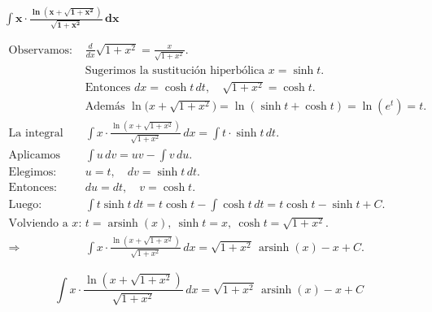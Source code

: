 $\displaystyle \mathbf{\int x \cdot \frac{\ln\left(x + \sqrt{1 + x^{2}}\right)}{\sqrt{1 + x^{2}}}\,dx}$

\nopagebreak
$$
\begin{aligned}
\text{Observamos: } &
\frac{d}{dx}\sqrt{1+x^{2}}=\frac{x}{\sqrt{1+x^{2}}}. \\[6pt]
&\text{Sugerimos la sustitución hiperbólica } x=\sinh t. \\[4pt]
&\text{Entonces } dx=\cosh t\,dt,\quad \sqrt{1+x^{2}}=\cosh t. \\[6pt]
&\text{Además } \ln\big(x+\sqrt{1+x^{2}}\big)
= \ln(\sinh t+\cosh t)=\ln(e^{t})=t. \\[8pt]
\text{La integral queda: } &
\int x\cdot\frac{\ln(x+\sqrt{1+x^{2}})}{\sqrt{1+x^{2}}}\,dx
= \int t\cdot\sinh t\,dt. \\[10pt]
\text{Aplicamos integración por partes: } &
\int u\,dv = uv - \int v\,du. \\[6pt]
\text{Elegimos: } &
u=t,\quad dv=\sinh t\,dt. \\[4pt]
\text{Entonces: } &
du=dt,\quad v=\cosh t. \\[6pt]
\text{Luego: } &
\int t\sinh t\,dt = t\cosh t - \int \cosh t\,dt
= t\cosh t - \sinh t + C. \\[10pt]
\text{Volviendo a } x: &
t=\operatorname{arsinh}(x),\ \sinh t = x,\ \cosh t=\sqrt{1+x^{2}}. \\[6pt]
\Rightarrow\quad &
\int x\cdot\frac{\ln(x+\sqrt{1+x^{2}})}{\sqrt{1+x^{2}}}\,dx
= \sqrt{1+x^{2}}\,\operatorname{arsinh}(x) - x + C.
\end{aligned}
$$

$$
\boxed{\displaystyle
\int x\cdot\frac{\ln(x+\sqrt{1+x^{2}})}{\sqrt{1+x^{2}}}\,dx
= \sqrt{1+x^{2}}\,\operatorname{arsinh}(x) - x + C
}
$$
